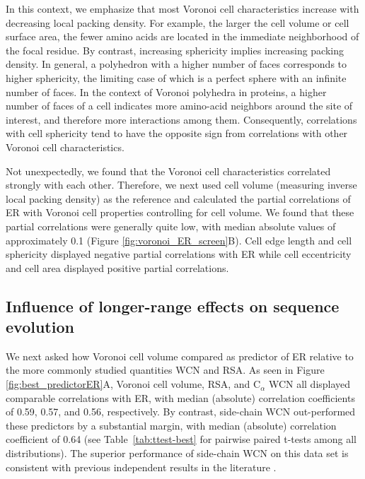\documentclass[12pt]{article}
\begin{document}
In this context, we emphasize that most Voronoi cell characteristics increase with decreasing local packing density. For example, the larger the cell volume or cell surface area, the fewer amino acids are located in the immediate neighborhood of the focal residue. By contrast, increasing sphericity implies increasing packing density. In general, a polyhedron with a higher number of faces corresponds to higher sphericity, the limiting case of which is a perfect sphere with an infinite number of faces. In the context of Voronoi polyhedra in proteins, a higher number of faces of a cell indicates more amino-acid neighbors around the site of interest, and therefore more interactions among them. Consequently, correlations with cell sphericity tend to have the opposite sign from correlations with other Voronoi cell characteristics.

Not unexpectedly, we found that the Voronoi cell characteristics correlated strongly with each other. Therefore, we next used cell volume (measuring inverse local packing density) as the reference and calculated the partial correlations of ER with Voronoi cell properties controlling for cell volume. We found that these partial correlations were generally quite low, with median absolute values of approximately 0.1  (Figure \ref{fig:voronoi_ER_screen}B). Cell edge length and cell sphericity displayed negative partial correlations with ER while cell eccentricity and cell area displayed positive partial correlations.

\subsection*{Influence of longer-range effects on sequence evolution}

We next asked how Voronoi cell volume compared as predictor of ER relative to the more commonly studied quantities WCN and RSA. As seen in Figure \ref{fig:best_predictorER}A, Voronoi cell volume, RSA, and C$_{\alpha}$ WCN all displayed comparable correlations with ER, with median (absolute) correlation coefficients of 0.59, 0.57, and 0.56, respectively. By contrast, side-chain WCN out-performed these predictors by a substantial margin, with median (absolute) correlation coefficient of 0.64 (see Table~\ref{tab:ttest-best} for pairwise paired t-tests among all distributions). The superior performance of side-chain WCN on this data set is consistent with previous independent results in the literature \cite{marcos_too_2015}. 
\end{document}
